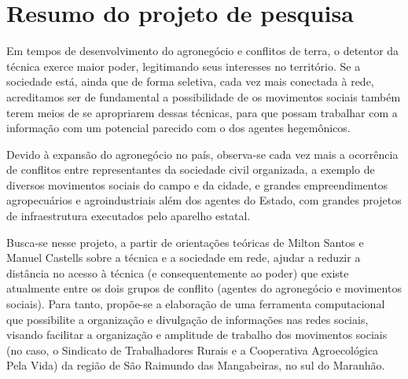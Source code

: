 
\section{Resumo do projeto de pesquisa}

Em tempos de desenvolvimento do agronegócio e conflitos de terra, o detentor da técnica exerce maior poder, legitimando seus interesses no território. Se a sociedade está, ainda que de forma seletiva, cada vez mais conectada à rede, acreditamos ser de fundamental a possibilidade de os movimentos sociais também terem meios de se apropriarem dessas técnicas, para que possam trabalhar com a informação com um potencial parecido com o dos agentes hegemônicos.

Devido à expansão do agronegócio no país, observa-se cada vez mais a ocorrência de  conflitos entre representantes da sociedade civil organizada, a exemplo de diversos movimentos sociais do campo e da cidade, e grandes empreendimentos agropecuários e agroindustriais além dos agentes do Estado, com  grandes projetos de infraestrutura executados pelo aparelho estatal.

Busca-se nesse projeto, a partir de orientações teóricas de Milton Santos e Manuel Castells sobre a técnica e a sociedade em rede, ajudar a reduzir a distância no acesso à técnica (e consequentemente ao poder) que existe atualmente entre os dois grupos de conflito (agentes do agronegócio e movimentos sociais). Para tanto, propõe-se a elaboração de uma ferramenta computacional que possibilite a organização e divulgação de informações nas redes sociais, visando facilitar a organização e amplitude de trabalho dos movimentos sociais (no caso, o Sindicato de Trabalhadores Rurais e a Cooperativa Agroecológica Pela Vida) da região de São Raimundo das Mangabeiras, no sul do Maranhão.




